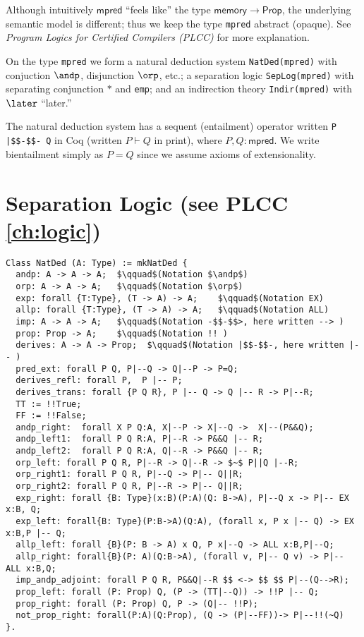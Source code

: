 \documentclass[12pt,fleqn,openany,oneside,showtrims]{memoir}
\newcommand{\ychapter}[2]{\chapter[#1]{#1 \hfill \normalsize #2}}
\begin{document}
Although intuitively $\mathsf{mpred}$
``feels like'' the type $\mathsf{memory}\rightarrow\mathsf{Prop}$,
the underlying semantic model is different;
thus we keep the type \lstinline{mpred} abstract (opaque).
See \emph{Program Logics for Certified Compilers (PLCC)} 
for more explanation.

On the type \lstinline{mpred}
we form a natural deduction  system 
\lstinline{NatDed(mpred)} with 
conjuction $\andp$, disjunction $\orp$, etc.;
a separation logic 
\lstinline{SepLog(mpred)} with 
separating conjunction $*$ and \lstinline{emp};
and an indirection theory 
\lstinline{Indir(mpred)} with $\later$ ``later.''

The natural deduction system has a sequent
(entailment) operator written \lstinline{P |$$-$$- Q} in Coq
(written $P\vdash Q$ in print), where $P,Q:\mathsf{mpred}$.  We write
bientailment simply as $P=Q$ since we
assume axioms of extensionality.




\ychapter{Separation Logic}{(see PLCC \autoref{ch:logic})}
\begin{lstlisting}
Class NatDed (A: Type) := mkNatDed {
  andp: A -> A -> A;  $\qquad$(Notation $\andp$)
  orp: A -> A -> A;   $\qquad$(Notation $\orp$)
  exp: forall {T:Type}, (T -> A) -> A;    $\qquad$(Notation EX)
  allp: forall {T:Type}, (T -> A) -> A;   $\qquad$(Notation ALL)
  imp: A -> A -> A;   $\qquad$(Notation -$$-$$>, here written --> )
  prop: Prop -> A;    $\qquad$(Notation !! )
  derives: A -> A -> Prop;  $\qquad$(Notation |$$-$$-, here written |-- )
  pred_ext: forall P Q, P|--Q -> Q|--P -> P=Q;
  derives_refl: forall P,  P |-- P;
  derives_trans: forall {P Q R}, P |-- Q -> Q |-- R -> P|--R;
  TT := !!True;
  FF := !!False;
  andp_right:  forall X P Q:A, X|--P -> X|--Q ->  X|--(P&&Q);
  andp_left1:  forall P Q R:A, P|--R -> P&&Q |-- R;
  andp_left2:  forall P Q R:A, Q|--R -> P&&Q |-- R;
  orp_left: forall P Q R, P|--R -> Q|--R -> $~$ P||Q |--R;
  orp_right1: forall P Q R, P|--Q -> P|-- Q||R;
  orp_right2: forall P Q R, P|--R -> P|-- Q||R;
  exp_right: forall {B: Type}(x:B)(P:A)(Q: B->A), P|--Q x -> P|-- EX x:B, Q;
  exp_left: forall{B: Type}(P:B->A)(Q:A), (forall x, P x |-- Q) -> EX x:B,P |-- Q;
  allp_left: forall {B}(P: B -> A) x Q, P x|--Q -> ALL x:B,P|--Q;
  allp_right: forall{B}(P: A)(Q:B->A), (forall v, P|-- Q v) -> P|-- ALL x:B,Q;
  imp_andp_adjoint: forall P Q R, P&&Q|--R $$ <-> $$ $$ P|--(Q-->R);
  prop_left: forall (P: Prop) Q, (P -> (TT|--Q)) -> !!P |-- Q;
  prop_right: forall (P: Prop) Q, P -> (Q|-- !!P);
  not_prop_right: forall(P:A)(Q:Prop), (Q -> (P|--FF))-> P|--!!(~Q)
}.
\end{lstlisting}
\end{document}
